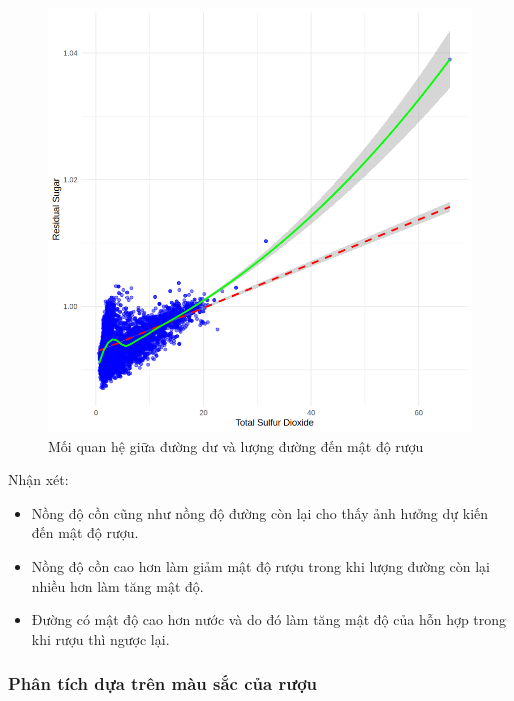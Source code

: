 \begin{figure}[H]
    \centering
    \includegraphics[width=0.75\columnwidth]{wine_colors/wine_sugar_density.png}
    \caption{Mối quan hệ giữa đường dư và lượng đường đến mật độ rượu}
    \label{fig:wine_sugar_density}
\end{figure}

Nhận xét:
\begin{itemize}
    \item Nồng độ cồn cũng như nồng độ đường còn lại cho thấy ảnh hưởng dự kiến đến mật độ rượu.
    \item Nồng độ cồn cao hơn làm giảm mật độ rượu trong khi lượng đường còn lại nhiều hơn làm tăng mật độ.
    \item  Đường có mật độ cao hơn nước và do đó làm tăng mật độ của hỗn hợp trong khi rượu thì ngược lại.
\end{itemize}

\subsubsection{Phân tích dựa trên màu sắc của rượu}

